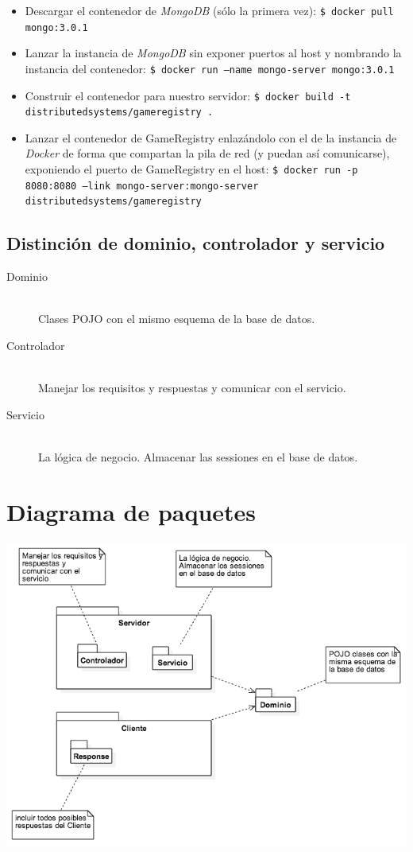 \documentclass[12pt,a4paper]{report}
\begin{document}
\begin{itemize}
 \item Descargar el contenedor de \emph{MongoDB} (sólo la primera vez): \texttt{\$ docker pull mongo:3.0.1}
 \item Lanzar la instancia de \emph{MongoDB} sin exponer puertos al host y nombrando la instancia del contenedor:
       \texttt{\$ docker run --name mongo-server mongo:3.0.1}
 \item Construir el contenedor para nuestro servidor: \texttt{\$ docker build -t distributedsystems/gameregistry .}
 \item Lanzar el contenedor de GameRegistry enlazándolo con el de la instancia de \emph{Docker} de forma
       que compartan la pila de red (y puedan así comunicarse), exponiendo el puerto de GameRegistry en el host:
       \texttt{\$ docker run -p 8080:8080 --link mongo-server:mongo-server distributedsystems/gameregistry}
\end{itemize}

\subsection{Distinción de dominio, controlador y servicio}
\begin{description}
  \item[Dominio] \hfill \\
  Clases POJO con el mismo esquema de la base de datos.
  \item[Controlador] \hfill \\
  Manejar los requisitos y respuestas y comunicar con el servicio.
  \item[Servicio] \hfill \\
  La lógica de negocio. Almacenar las sessiones en el base de datos.
\end{description}

\section{Diagrama de paquetes}
\begin{center}
 \includegraphics[scale=0.6]{diagrams/package_diagram.png}
\end{center}
\end{document}
